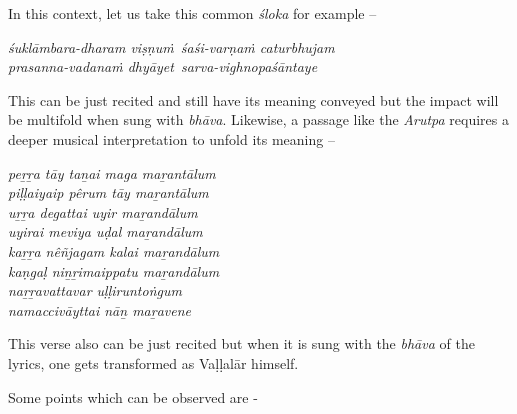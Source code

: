 In this context, let us take this common \textit{śloka} for example –

\begin{longquote}
\textit{śuklāmbara-dharam viṣṇuṁ śaśi-varṇaṁ caturbhujam }\\ 
\textit{prasanna-vadanaṁ dhyāyet sarva-vighnopaśāntaye }
\end{longquote}

This can be just recited and still have its meaning conveyed but the impact will be multifold when sung with \textit{bhāva}. Likewise, a passage like the \textit{Arutpa} requires a deeper musical interpretation to unfold its meaning –

\begin{longquote}
\end{longquote}

\begin{longquote}
\textit{peṟṟa tāy taṉai maga maṟantālum\\ piḷḷaiyaip pêrum tāy maṟantālum\\ uṟṟa degattai uyir maṟandālum\\ uyirai meviya uḍal maṟandālum\\ kaṟṟa nêñjagam kalai maṟandālum\\ kaṇgaḷ niṉṟimaippatu maṟandālum\\ naṟṟavattavar uḷḷiruntoṅgum\\ namaccivāyttai nāṉ maṟavene}
\end{longquote}

This verse also can be just recited but when it is sung with the \textit{bhāva} of the lyrics, one gets transformed as Vaḷḷalār himself.

Some points which can be observed are -

\vspace{-.3cm}

